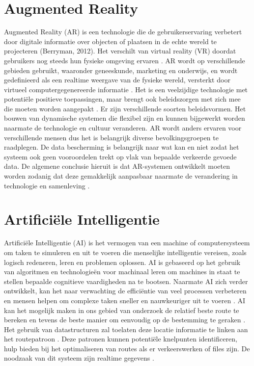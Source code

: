 \section{Augmented Reality}
\label{sec:augmented reality}
Augmented Reality (AR) is een technologie die de gebruikerservaring verbetert door digitale informatie over objecten of plaatsen in de echte wereld te projecteren (Berryman, 2012). Het verschilt van virtual reality (VR) doordat gebruikers nog steeds hun fysieke omgeving ervaren \autocite{Calo2015}. AR wordt op verschillende gebieden gebruikt, waaronder geneeskunde, marketing en onderwijs, en wordt gedefinieerd als een realtime weergave van de fysieke wereld, versterkt door virtueel computergegenereerde informatie \autocite{Carmigniani2011}. Het is een veelzijdige technologie met potentiële positieve toepassingen, maar brengt ook beleidszorgen met zich mee die moeten worden aangepakt \autocite{Calo2015}. Er zijn verschillende soorten beleidsvormen. Het bouwen van dynamische systemen die flexibel zijn en kunnen bijgewerkt worden naarmate de technologie en cultuur veranderen. AR wordt anders ervaren voor verschillende mensen dus het is belangrijk diverse bevolkingsgroepen te raadplegen. De data bescherming is belangrijk naar wat kan en niet zodat het systeem ook geen vooroordelen trekt op vlak van bepaalde verkeerde gevoede data. De algemene conclusie hieruit is dat AR-systemen ontwikkelt moeten worden zodanig dat deze gemakkelijk aanpasbaar naarmate de verandering in technologie en samenleving \autocite{Calo2015}.
\section{Artificiële Intelligentie}
\label{sec:artificiële intelligentie}
Artificiële Intelligentie (AI) is het vermogen van een machine of computersysteem om taken te simuleren en uit te voeren die menselijke intelligentie vereisen, zoals logisch redeneren, leren en problemen oplossen. AI is gebaseerd op het gebruik van algoritmen en technologieën voor machinaal leren om machines in staat te stellen bepaalde cognitieve vaardigheden na te bootsen. Naarmate AI zich verder ontwikkelt, kan het naar verwachting de efficiëntie van veel processen verbeteren en mensen helpen om complexe taken sneller en nauwkeuriger uit te voeren \autocite{Sabouret2020}. AI kan het mogelijk maken in ons gebied van onderzoek de relatief beste route te bereken en tevens de beste manier om eenvoudig op de bestemming te geraken \autocite{Soni2023a}. Het gebruik van datastructuren zal toelaten deze locatie informatie te linken aan het routepatroon \autocite{Ruta2010}. Deze patronen kunnen potentiële knelpunten identificeren, hulp bieden bij het optimaliseren van routes als er verkeerswerken of files zijn. De noodzaak van dit systeem zijn realtime gegevens \autocite{Ciravegna2018}.
